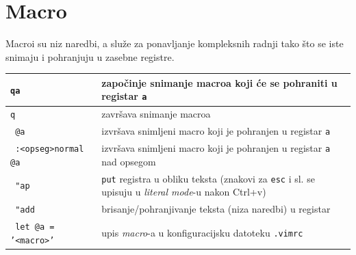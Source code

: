 \documentclass[10pt]{article}
\begin{document}
    \section*{\color{ForestGreen} Macro}
    Macroi su niz naredbi, a služe za ponavljanje kompleksnih radnji tako što se iste snimaju i pohranjuju u zasebne registre.
    \\
    \begin{tabular}{|>{\tt}p{9.00cm}|>{}p{15.50cm}|}
        \hline
        qa                              & započinje snimanje macroa koji će se pohraniti u registar \texttt{a}                                                      \\ \hline
        q                               & završava snimanje macroa                                                                                                  \\ \hline
        @a                              & izvršava snimljeni macro koji je pohranjen u registar \texttt{a}                                                          \\ \hline
        :<opseg>normal @a               & izvršava snimljeni macro koji je pohranjen u registar \texttt{a} nad opsegom                                              \\ \hline
        "ap                             & \texttt{put} registra u obliku teksta (znakovi za \texttt{esc} i sl. se upisuju u \textit{literal mode}-u nakon Ctrl+v)   \\ \hline
        "add                            & brisanje/pohranjivanje teksta (niza naredbi) u registar                                                                   \\ \hline
        let @a = '<macro>'              & upis \textit{macro}-a u konfiguracijsku datoteku \texttt{.vimrc}                                                          \\ \hline
    \end{tabular}
    \newpage
    
\end{document}
